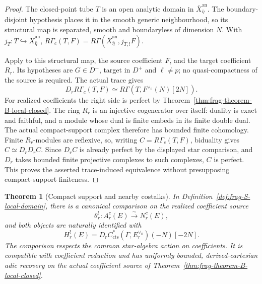 \documentclass[11pt]{article}
\newtheorem{theorem}{Theorem}[section]
\theoremstyle{definition}
\theoremstyle{remark}
\begin{document}
\begin{proof}
The closed-point tube $T$ is an open analytic domain in
$\overline X_{\bar\eta}^{\mathrm{an}}$.  The boundary-disjoint hypothesis
places it in the smooth generic neighbourhood, so its structural map
is separated, smooth and boundaryless of dimension $N$.  With
$j_T:T\hookrightarrow\overline X_{\bar\eta}^{\mathrm{an}}$,
$R\Gamma_c(T,F)=R\Gamma(\overline X_{\bar\eta}^{\mathrm{an}},j_{T,!}F)$.

Apply \cite[Theorem 7.3.1]{BerkovichEtale} to this structural map,
the source coefficient $F$, and the target coefficient $R_r$.
Its hypotheses are $G\in D^-$, target in $D^+$ and $\ell\ne p$;
no quasi-compactness of the source is required.  The actual trace gives
\[
 D_rR\Gamma_c(T,F)\simeq R\Gamma(T,F^{\vee_0}(N)[2N]).
\]
For realized coefficients the right side is perfect by
Theorem~\ref{thm:frag-theorem-B-local-closed}.
The ring $R_r$ is an injective cogenerator over itself: duality is
exact and faithful, and a module whose dual is finite embeds in
its finite double dual.  The actual compact-support complex therefore
has bounded finite cohomology.  Finite $R_r$-modules are reflexive,
so, writing $C=R\Gamma_c(T,F)$, biduality gives $C\simeq D_rD_rC$.
Since $D_rC$ is already perfect by the displayed star comparison,
and $D_r$ takes bounded finite projective complexes to such complexes,
$C$ is perfect.  This proves the asserted trace-induced equivalence
without presupposing compact-support finiteness.
\end{proof}

\begin{theorem}[Compact support and nearby costalks]
\label{thm:frag-S-local-closed}
In Definition~\ref{def:frag-S-local-domain}, there is a canonical
comparison on the realized coefficient source
\[
 \theta^!_r:A^c_r(E)\xrightarrow{\sim}N^c_r(E),
\]
and both objects are naturally identified with
\[
 H^!_r(E)=D_r C^*_{\mathrm{cts}}(\Gamma,E_r^{\vee_0})(-N)[-2N].
\label{eq:frag-S-local-dual-formula}
\]
The comparison respects the common star-algebra action on coefficients.
It is compatible with coefficient reduction and has uniformly bounded,
derived-cartesian adic recovery on the actual coefficient source of
Theorem~\ref{thm:frag-theorem-B-local-closed}.
\end{theorem}
\end{document}
